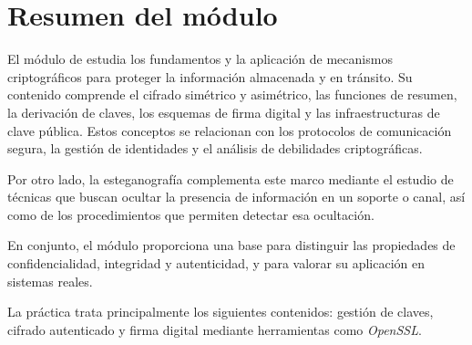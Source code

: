 \chapter{Resumen del módulo}
\label{sec:resumen}

El módulo de \textit{\Modulo} estudia los fundamentos y la aplicación de mecanismos criptográficos para proteger la información almacenada y en tránsito. Su contenido comprende el cifrado simétrico y asimétrico, las funciones de resumen, la derivación de claves, los esquemas de firma digital y las infraestructuras de clave pública. Estos conceptos se relacionan con los protocolos de comunicación segura, la gestión de identidades y el análisis de debilidades criptográficas.

Por otro lado, la esteganografía complementa este marco mediante el estudio de técnicas que buscan ocultar la presencia de información en un soporte o canal, así como de los procedimientos que permiten detectar esa ocultación.

En conjunto, el módulo proporciona una base para distinguir las propiedades de confidencialidad, integridad y autenticidad, y para valorar su aplicación en sistemas reales.

La práctica trata principalmente los siguientes contenidos: gestión de claves, cifrado autenticado y firma digital mediante herramientas como \textit{OpenSSL}.
